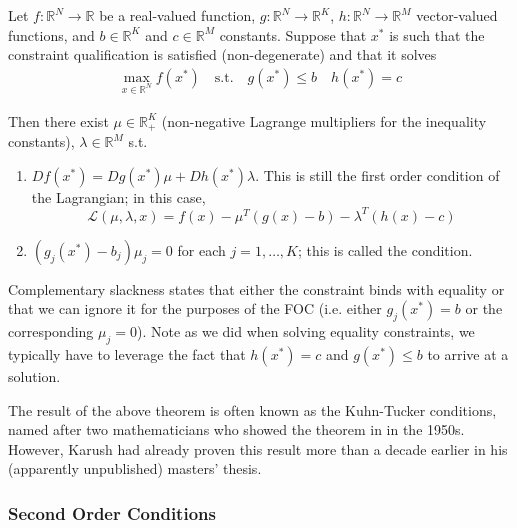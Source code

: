 \documentclass{article}
\begin{document}
\begin{theorem}\label{thm:lecture5_kkt}
  Let $f: \mathbb{R}^N \to \mathbb{R}$ be a real-valued function, $g: \mathbb{R}^N \to \mathbb{R}^K$, $h: \mathbb{R}^N \to \mathbb{R}^M$ vector-valued functions, and $b \in \mathbb{R}^K$ and $c \in \mathbb{R}^M$ constants. Suppose that $x^*$ is such that the constraint qualification is satisfied (non-degenerate) and that it solves
  \begin{align*}
    \max_{x \in \mathbb{R}^N} f(x^*)
    \quad
    \text{s.t.}
    \quad
    g(x^*) \le b
    \quad
    h(x^*) = c
  \end{align*}

  Then there exist $\mu \in \mathbb{R}^K_{+}$ (non-negative Lagrange multipliers for the inequality constants), $\lambda \in \mathbb{R}^M$ s.t.
  \begin{enumerate}
    \item $Df(x^*) = Dg(x^*) \mu + Dh(x^*)\lambda$. This is still the first order condition of the Lagrangian; in this case,
      \[
        \mathcal{L}(\mu, \lambda, x) = f(x) - \mu^T (g(x) - b) - \lambda^T (h(x) - c)
      \]

    \item $(g_j(x^*) - b_j) \mu_j = 0$ for each $j = 1, \ldots, K$; this is called the  condition.
  \end{enumerate}
\end{theorem}

Complementary slackness states that either the constraint binds with equality or that we can ignore it for the purposes of the FOC (i.e. either $g_j(x^*) = b$ or the corresponding $\mu_j = 0$). Note as we did when solving equality constraints, we typically have to leverage the fact that $h(x^*) = c$ and $g(x^*) \le b$ to arrive at a solution.

\begin{remark}
  The result of the above theorem is often known as the Kuhn-Tucker conditions, named after two mathematicians who showed the theorem in in the 1950s. However, Karush had already proven this result more than a decade earlier in his (apparently unpublished) masters' thesis.
\end{remark}

\subsubsection{Second Order Conditions}
\label{ssub:second_order_conditions}
\end{document}
